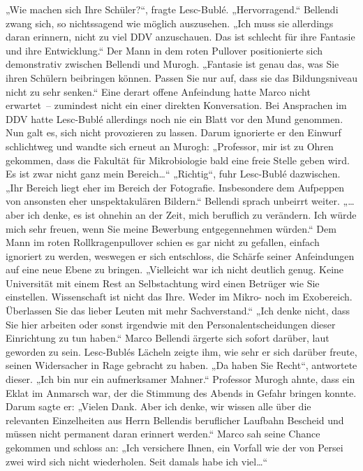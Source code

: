 „Wie machen sich Ihre Schüler?“, fragte Lesc-Bublé.
„Hervorragend.“ Bellendi zwang sich, so nichtssagend wie möglich auszusehen. „Ich muss sie allerdings daran erinnern, nicht zu viel DDV anzuschauen. Das ist schlecht für ihre Fantasie und ihre Entwicklung.“
Der Mann in dem roten Pullover positionierte sich demonstrativ zwischen Bellendi und Murogh. „Fantasie ist genau das, was Sie ihren Schülern beibringen können. Passen Sie nur auf, dass sie das Bildungsniveau nicht zu sehr senken.“
Eine derart offene Anfeindung hatte Marco nicht erwartet – zumindest nicht ein einer direkten Konversation. Bei Ansprachen im DDV hatte Lesc-Bublé allerdings noch nie ein Blatt vor den Mund genommen. Nun galt es, sich nicht provozieren zu lassen. Darum ignorierte er den Einwurf schlichtweg und wandte sich erneut an Murogh: „Professor, mir ist zu Ohren gekommen, dass die Fakultät für Mikrobiologie bald eine freie Stelle geben wird. Es ist zwar nicht ganz mein Bereich…“
„Richtig“, fuhr Lesc-Bublé dazwischen. „Ihr Bereich liegt eher im Bereich der Fotografie. Insbesondere dem Aufpeppen von ansonsten eher unspektakulären Bildern.“
Bellendi sprach unbeirrt weiter. „… aber ich denke, es ist ohnehin an der Zeit, mich beruflich zu verändern. Ich würde mich sehr freuen, wenn Sie meine Bewerbung entgegennehmen würden.“
Dem Mann im roten Rollkragenpullover schien es gar nicht zu gefallen, einfach ignoriert zu werden, weswegen er sich entschloss, die Schärfe seiner Anfeindungen auf eine neue Ebene zu bringen. „Vielleicht war ich nicht deutlich genug. Keine Universität mit einem Rest an Selbstachtung wird einen Betrüger wie Sie einstellen. Wissenschaft ist nicht das Ihre. Weder im Mikro- noch im Exobereich. Überlassen Sie das lieber Leuten mit mehr Sachverstand.“
„Ich denke nicht, dass Sie hier arbeiten oder sonst irgendwie mit den Personalentscheidungen dieser Einrichtung zu tun haben.“ Marco Bellendi ärgerte sich sofort darüber, laut geworden zu sein. Lesc-Bublés Lächeln zeigte ihm, wie sehr er sich darüber freute, seinen Widersacher in Rage gebracht zu haben.
„Da haben Sie Recht“, antwortete dieser. „Ich bin nur ein aufmerksamer Mahner.“
Professor Murogh ahnte, dass ein Eklat im Anmarsch war, der die Stimmung des Abends in Gefahr bringen konnte. Darum sagte er: „Vielen Dank. Aber ich denke, wir wissen alle über die relevanten Einzelheiten aus Herrn Bellendis beruflicher Laufbahn Bescheid und müssen nicht permanent daran erinnert werden.“
Marco sah seine Chance gekommen und schloss an: „Ich versichere Ihnen, ein Vorfall wie der von Persei zwei wird sich nicht wiederholen. Seit damals habe ich viel…“
